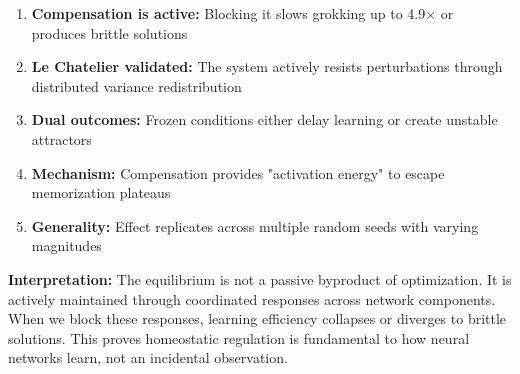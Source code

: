\begin{enumerate}
\item \textbf{Compensation is active:} Blocking it slows grokking up to 4.9× or produces brittle solutions
\item \textbf{Le Chatelier validated:} The system actively resists perturbations through distributed variance redistribution
\item \textbf{Dual outcomes:} Frozen conditions either delay learning or create unstable attractors
\item \textbf{Mechanism:} Compensation provides "activation energy" to escape memorization plateaus
\item \textbf{Generality:} Effect replicates across multiple random seeds with varying magnitudes
\end{enumerate}

\textbf{Interpretation:} The equilibrium is not a passive byproduct of optimization. It is actively maintained through coordinated responses across network components. When we block these responses, learning efficiency collapses or diverges to brittle solutions. This proves homeostatic regulation is fundamental to how neural networks learn, not an incidental observation.
